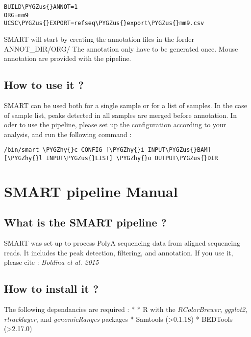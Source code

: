 \documentclass[letterpaper,10pt,english]{sphinxmanual}
\def\PYGZus{\char`\_}
\def\PYGZhy{\char`\-}
\begin{document}
\begin{Verbatim}[commandchars=\\\{\}]
BUILD\PYGZus{}ANNOT=1
ORG=mm9
UCSC\PYGZus{}EXPORT=refseq\PYGZus{}export\PYGZus{}mm9.csv
\end{Verbatim}

SMART will start by creating the annotation files in the forder ANNOT\_DIR/ORG/
The annotation only have to be generated once. Mouse annotation are provided with the pipeline.


\section{How to use it ?}
\label{QUICKSTART:how-to-use-it}
SMART can be used both for a single sample or for a list of samples.
In the case of sample list, peaks detected in all samples are merged before annotation.
In oder to use the pipeline, please set up the configuration according to your analysis, and run the following command :

\begin{Verbatim}[commandchars=\\\{\}]
/bin/smart \PYGZhy{}c CONFIG [\PYGZhy{}i INPUT\PYGZus{}BAM] [\PYGZhy{}l INPUT\PYGZus{}LIST] \PYGZhy{}o OUTPUT\PYGZus{}DIR
\end{Verbatim}


\chapter{SMART pipeline Manual}
\label{MANUAL:smart-pipeline-manual}\label{MANUAL::doc}

\section{What is the SMART pipeline ?}
\label{MANUAL:what-is-the-smart-pipeline}
SMART was set up to process PolyA sequencing data from aligned sequencing reads.
It includes the peak detection, filtering, and annotation.
If you use it, please cite :
\emph{Boldina et al. 2015}


\section{How to install it ?}
\label{MANUAL:how-to-install-it}
The following dependancies are required :
*
* R with the \emph{RColorBrewer}, \emph{ggplot2}, \emph{rtracklayer}, and \emph{genomicRanges} packages
* Samtools (\textgreater{}0.1.18)
* BEDTools (\textgreater{}2.17.0)
\end{document}
